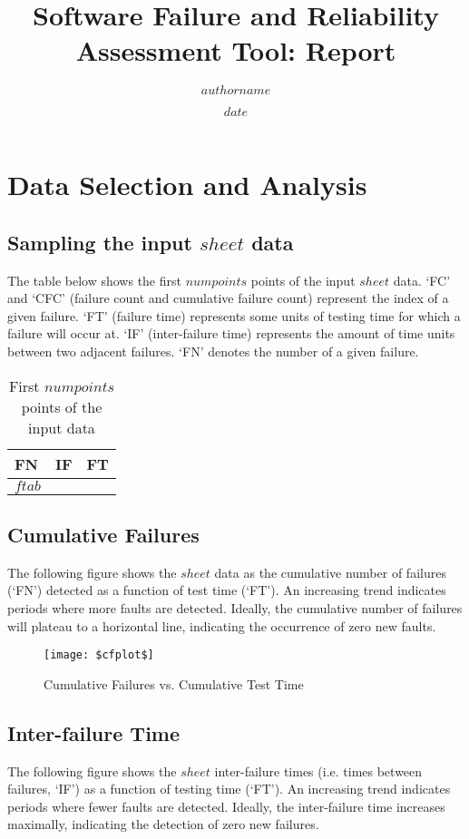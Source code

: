 \documentclass{article}
\title{Software Failure and Reliability Assessment Tool: Report}
\author{$authorname$}
\date{$date$}
\begin{document}
\maketitle




\section{Data Selection and Analysis}
\subsection{Sampling the input $sheet$ data}
The table below shows the first $numpoints$ points of the input $sheet$ data. `FC' and `CFC' (failure count and cumulative failure count) represent the index of a given failure. `FT' (failure time) represents some units of testing time for which a failure will occur at. `IF' (inter-failure time) represents the amount of time units between two adjacent failures. `FN' denotes the number of a given failure.

\begin{table}[h!]
\centering
\caption{First $numpoints$ points of the input data}
\begin{tabular}{lll}
\hline
FN & IF & FT \\ \hline
$ftab$
\hline
\end{tabular}
\end{table}



\newpage
\subsection{Cumulative Failures}
The following figure shows the $sheet$ data as the cumulative number of failures (`FN') detected as a function of test time (`FT'). An increasing trend indicates periods where more faults are detected. Ideally, the cumulative number of failures will plateau to a horizontal line, indicating the occurrence of zero new faults.

\begin{figure}[h!]
\centering
\texttt{[image: \$cfplot\$]}
\caption{Cumulative Failures vs. Cumulative Test Time}
\label{fig:cfplot}
\end{figure}



\newpage
\subsection{Inter-failure Time}
The following figure shows the $sheet$ inter-failure times (i.e. times between failures, `IF') as a function of testing time (`FT'). An increasing trend indicates periods where fewer faults are detected. Ideally, the inter-failure time increases maximally, indicating the detection of zero new failures.
\end{document}

